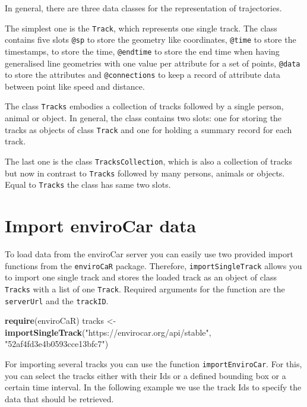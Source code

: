 \documentclass[]{article}
\newenvironment{Shaded}{\begin{snugshade}}{\end{snugshade}}
\newcommand{\KeywordTok}[1]{\textcolor[rgb]{0.13,0.29,0.53}{\textbf{{#1}}}}
\newcommand{\StringTok}[1]{\textcolor[rgb]{0.31,0.60,0.02}{{#1}}}
\newcommand{\NormalTok}[1]{{#1}}
\begin{document}
In general, there are three data classes for the representation of
trajectories.

The simplest one is the \texttt{Track}, which represents one single
track. The class contains five slots \texttt{@sp} to store the geometry
like coordinates, \texttt{@time} to store the timestamps, to store the
time, \texttt{@endtime} to store the end time when having generalised
line geometries with one value per attribute for a set of points,
\texttt{@data} to store the attributes and \texttt{@connections} to keep
a record of attribute data between point like speed and distance.

The class \texttt{Tracks} embodies a collection of tracks followed by a
single person, animal or object. In general, the class contains two
slots: one for storing the tracks as objects of class \texttt{Track} and
one for holding a summary record for each track.

The last one is the class \texttt{TracksCollection}, which is also a
collection of tracks but now in contrast to \texttt{Tracks} followed by
many persons, animals or objects. Equal to \texttt{Tracks} the class has
same two slots.

\section{Import enviroCar data}\label{import-envirocar-data}

To load data from the enviroCar server you can easily use two provided
import functions from the \texttt{enviroCaR} package. Therefore,
\texttt{importSingleTrack} allows you to import one single track and
stores the loaded track as an object of class \texttt{Tracks} with a
list of one \texttt{Track}. Required arguments for the function are the
\texttt{serverUrl} and the \texttt{trackID}.

\begin{Shaded}
\begin{Highlighting}[]
\KeywordTok{require}\NormalTok{(enviroCaR)}
\NormalTok{tracks <-}\StringTok{ }\KeywordTok{importSingleTrack}\NormalTok{(}\StringTok{"https://envirocar.org/api/stable"}\NormalTok{, }\StringTok{"52af4fd3e4b0593cce13bfc7"}\NormalTok{)}
\end{Highlighting}
\end{Shaded}

For importing several tracks you can use the function
\texttt{importEnviroCar}. For this, you can select the tracks either
with their Ids or a defined bounding box or a certain time interval. In
the following example we use the track Ids to specify the data that
should be retrieved.
\end{document}
